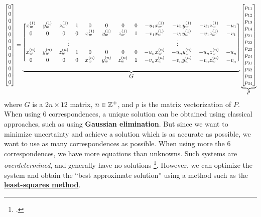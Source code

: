 \setcounter{MaxMatrixCols}{20}
\begin{equation}
    \scalemath{0.9}{
    \begin{bmatrix}
        0 \\ 0 \\ 0 \\ 0 \\ 0 \\ 0 \\ 0 \\ 0 \\ 0 \\ 0 \\ 0 \\ 0
    \end{bmatrix}
    =
    \underbrace{
        \begin{blockarray}{[*{12}c]}
            x_w^{(1)} & y_w^{(1)} & z_w^{(1)} & 1 & 0         & 0         & 0         & 0 & -u_1 x_w^{(1)} & -u_1 y_w^{(1)} & -u_1 z_w^{(1)} & -u_1 \\
            0         & 0         & 0         & 0 & x_w^{(1)} & y_w^{(1)} & z_w^{(1)} & 1 & -v_1 x_w^{(1)} & -v_1 y_w^{(1)} & -v_1 z_w^{(1)} & -v_1 \\
            \BAmulticolumn{6}{c}{\vdots} & \BAmulticolumn{6}{c}{\vdots} \\
            x_w^{(n)} & y_w^{(n)} & z_w^{(n)} & 1 & 0         & 0         & 0         & 0 & -u_n x_w^{(n)} & -u_n y_w^{(n)} & -u_n z_w^{(n)} & -u_n \\
            0         & 0         & 0         & 0 & x_w^{(n)} & y_w^{(n)} & z_w^{(n)} & 1 & -v_n x_w^{(n)} & -v_n y_w^{(n)} & -v_n z_w^{(n)} & -v_n
        \end{blockarray}
    }_{\mathlarger{G}}
    \underbrace{
        \begin{bmatrix}
            p_{11} \\ p_{12} \\ p_{13} \\ p_{14} \\ p_{21} \\ p_{22} \\ p_{23} \\ p_{24} \\ p_{31} \\ p_{32} \\ p_{33} \\ p_{34}
        \end{bmatrix}
    }_{\mathlarger{p}}
    }
\end{equation}
where $G$ is a $2n \times 12$ matrix, $n \in \mathbb{Z}^+$, and $p$ is the matrix vectorization of $P$. When using 6 correspondences, a unique solution can be obtained using classical approaches, such as using 
\textbf{Gaussian elimination}. But since we want to minimize uncertainty and achieve a solution which is as accurate as possible, we want to use as many correspondences as possible. When using more the 6 correspondences, we have more equations than unknowns. Such systems are \emph{overdetermined}, and generally have no solutions \footcite{williamsOverdeterminedSystems1990}. However, we can optimize the system and obtain the ``best approximate solution'' using a method such as the \hyperref[sec:clss]{\textbf{least-squares method}}. 

